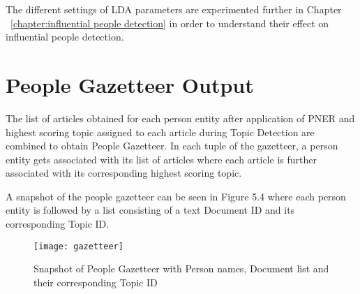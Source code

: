 The different settings of LDA parameters are experimented further in Chapter ~\ref{chapter:influential people detection} in order to understand their effect on influential people detection.
\section{People Gazetteer Output }
\label{gaz:result}

The list of articles obtained for each person entity after application of PNER and highest scoring topic assigned to each article during Topic Detection are combined to obtain People Gazetteer. In each tuple of the gazetteer, a person entity gets associated with its list of articles where each article is further associated with its corresponding highest scoring topic.

A snapshot of the people gazetteer can be seen in Figure 5.4 where each person entity is followed by a list consisting of a text Document ID and its corresponding Topic ID. 
\begin{figure}[!h]
\texttt{[image: gazetteer]}
\caption{Snapshot of People Gazetteer with Person names, Document list and their corresponding Topic ID}
\end{figure} 

